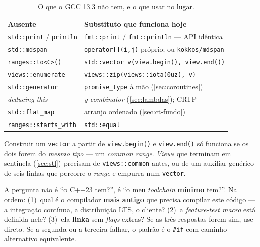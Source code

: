 \begin{table}[htbp]
\centering
\caption{O que o GCC 13.3 não tem, e o que usar no lugar.}
\label{tab:cpp23-faltando}
\footnotesize
\begin{tabular}{@{}ll@{}}
\toprule
\textbf{Ausente} & \textbf{Substituto que funciona hoje} \\
\midrule
\texttt{std::print} / \texttt{println} & \texttt{fmt::print} / \texttt{fmt::println} --- API idêntica \\
\texttt{std::mdspan}          & \texttt{operator[](i,j)} próprio; ou \texttt{kokkos/mdspan} \\
\texttt{ranges::to<C>()}      & \texttt{std::vector v(view.begin(), view.end())} \\
\texttt{views::enumerate}     & \texttt{views::zip(views::iota(0uz), v)} \\
\texttt{std::generator}       & \texttt{promise\_type} à mão (\cref{sec:coroutines}) \\
\emph{deducing this}          & \emph{y-combinator} (\cref{sec:lambdas}); CRTP \\
\texttt{std::flat\_map}       & arranjo ordenado (\cref{sec:ct-fundo}) \\
\texttt{ranges::starts\_with} & \texttt{std::equal} \\
\bottomrule
\end{tabular}
\end{table}

\begin{armadilha}
Construir um \texttt{vector} a partir de \texttt{view.begin()} e
\texttt{view.end()} só funciona se os dois forem do \emph{mesmo tipo} --- um
\emph{common range}. \emph{Views} que terminam em sentinela (\cref{sec:stl})
precisam de \texttt{views::common} antes, ou de um auxiliar genérico de seis
linhas que percorre o \emph{range} e empurra num \texttt{vector}.
\end{armadilha}

\begin{regra}
A pergunta não é ``o C++23 tem?'', é ``o meu \emph{toolchain} \textbf{mínimo}
tem?''. Na ordem: (1)~qual é o compilador \textbf{mais antigo} que precisa
compilar este código --- a integração contínua, a distribuição LTS, o cliente?
(2)~a \emph{feature-test macro} está definida nele? (3)~ela \textbf{linka} sem
\emph{flags} extras? Se as três respostas forem sim, use direto. Se a segunda ou
a terceira falhar, o padrão é o \texttt{\#if} com caminho alternativo
equivalente.
\end{regra}

